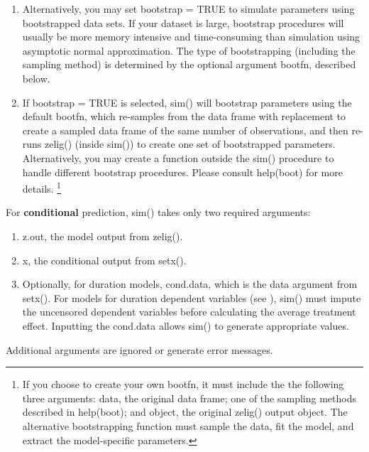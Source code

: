 \documentclass[letterpaper,10pt,english]{sphinxmanual}
\begin{document}
\begin{enumerate}
\begin{enumerate}
\item {} 
Alternatively, you may set bootstrap = TRUE to simulate parameters
using bootstrapped data sets. If your dataset is large, bootstrap
procedures will usually be more memory intensive and
time-consuming than simulation using asymptotic normal
approximation. The type of bootstrapping (including the sampling
method) is determined by the optional argument bootfn, described
below.

\item {} 
If bootstrap = TRUE is selected, sim() will bootstrap parameters
using the default bootfn, which re-samples from the data frame
with replacement to create a sampled data frame of the same number
of observations, and then re-runs zelig() (inside sim()) to create
one set of bootstrapped parameters. Alternatively, you may create
a function outside the sim() procedure to handle different
bootstrap procedures. Please consult help(boot) for more
details. \footnote{
If you choose to create your own bootfn, it must include the the
following three arguments: data, the original data frame; one of the
sampling methods described in help(boot); and object, the original
zelig() output object. The alternative bootstrapping function must
sample the data, fit the model, and extract the model-specific
parameters.
}

\end{enumerate}

For \textbf{conditional} prediction, sim() takes only two required
arguments:
\begin{enumerate}
\item {} 
z.out, the model output from zelig().

\item {} 
x, the conditional output from setx().

\item {} 
Optionally, for duration models, cond.data, which is the data
argument from setx(). For models for duration dependent variables
(see ), sim() must impute the uncensored dependent variables
before calculating the average treatment effect. Inputting the
cond.data allows sim() to generate appropriate values.

\end{enumerate}

Additional arguments are ignored or generate error messages.

\end{enumerate}
\end{document}
